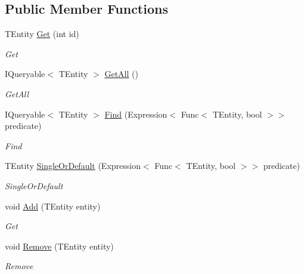 \subsection*{Public Member Functions}
\begin{DoxyCompactItemize}
\item 
T\+Entity \mbox{\hyperlink{interface_gtd_app_1_1_repository_1_1_interfaces_1_1_i_repository_a9f0a2115050565ee4984d43e9163f525}{Get}} (int id)
\begin{DoxyCompactList}\small\item\em Get \end{DoxyCompactList}\item 
I\+Queryable$<$ T\+Entity $>$ \mbox{\hyperlink{interface_gtd_app_1_1_repository_1_1_interfaces_1_1_i_repository_a1c97e47c04c2d00061a30fad1aabb977}{Get\+All}} ()
\begin{DoxyCompactList}\small\item\em Get\+All \end{DoxyCompactList}\item 
I\+Queryable$<$ T\+Entity $>$ \mbox{\hyperlink{interface_gtd_app_1_1_repository_1_1_interfaces_1_1_i_repository_a2b79b76e74629fd46fdce7e4caf1760d}{Find}} (Expression$<$ Func$<$ T\+Entity, bool $>$$>$ predicate)
\begin{DoxyCompactList}\small\item\em Find \end{DoxyCompactList}\item 
T\+Entity \mbox{\hyperlink{interface_gtd_app_1_1_repository_1_1_interfaces_1_1_i_repository_a82a2f97d2651121365bb7975974dc4a4}{Single\+Or\+Default}} (Expression$<$ Func$<$ T\+Entity, bool $>$$>$ predicate)
\begin{DoxyCompactList}\small\item\em Single\+Or\+Default \end{DoxyCompactList}\item 
void \mbox{\hyperlink{interface_gtd_app_1_1_repository_1_1_interfaces_1_1_i_repository_aa9b2613543ca7471d34aa20f57706604}{Add}} (T\+Entity entity)
\begin{DoxyCompactList}\small\item\em Get \end{DoxyCompactList}\item 
void \mbox{\hyperlink{interface_gtd_app_1_1_repository_1_1_interfaces_1_1_i_repository_ae140e5af29d395235ea159f58ecf5b47}{Remove}} (T\+Entity entity)
\begin{DoxyCompactList}\small\item\em Remove \end{DoxyCompactList}\end{DoxyCompactItemize}


